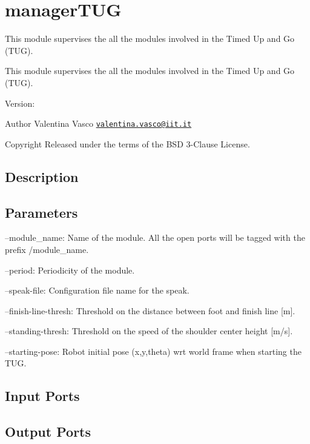 \section{manager\+T\+UG}
\label{group__managerTUG}


This module supervises the all the modules involved in the Timed Up and Go (T\+UG).  


This module supervises the all the modules involved in the Timed Up and Go (T\+UG). 

Version\+: \begin{DoxyAuthor}{Author}
Valentina Vasco \href{mailto:valentina.vasco@iit.it}{\tt valentina.\+vasco@iit.\+it} ~\newline
 
\end{DoxyAuthor}
\begin{DoxyCopyright}{Copyright}
Released under the terms of the B\+SD 3-\/\+Clause License. 
\end{DoxyCopyright}
\hypertarget{group__skeletonViewer_intro_sec}{}\subsection{Description}\label{group__skeletonViewer_intro_sec}
\hypertarget{group__skeletonViewer_parameters_sec}{}\subsection{Parameters}\label{group__skeletonViewer_parameters_sec}

\begin{DoxyItemize}
\item --module\+\_\+name\+: Name of the module. All the open ports will be tagged with the prefix /module\+\_\+name.
\item --period\+: Periodicity of the module.
\item --speak-\/file\+: Configuration file name for the speak.
\item --finish-\/line-\/thresh\+: Threshold on the distance between foot and finish line \mbox{[}m\mbox{]}.
\item --standing-\/thresh\+: Threshold on the speed of the shoulder center height \mbox{[}m/s\mbox{]}.
\item --starting-\/pose\+: Robot initial pose (x,y,theta) wrt world frame when starting the T\+UG. 
\end{DoxyItemize}\hypertarget{group__skeletonViewer_inputports_sec}{}\subsection{Input Ports}\label{group__skeletonViewer_inputports_sec}
\hypertarget{group__skeletonViewer_outputports_sec}{}\subsection{Output Ports}\label{group__skeletonViewer_outputports_sec}

